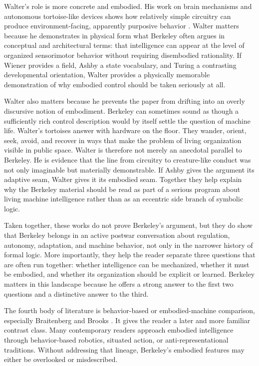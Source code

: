 \documentclass[11pt]{article}
\begin{document}
Walter's role is more concrete and embodied. His work on brain mechanisms and autonomous tortoise-like devices shows how relatively simple circuitry can produce environment-facing, apparently purposive behavior \citep{walter1953living}. Walter matters because he demonstrates in physical form what Berkeley often argues in conceptual and architectural terms: that intelligence can appear at the level of organized sensorimotor behavior without requiring disembodied rationality. If Wiener provides a field, Ashby a state vocabulary, and Turing a contrasting developmental orientation, Walter provides a physically memorable demonstration of why embodied control should be taken seriously at all.

Walter also matters because he prevents the paper from drifting into an overly discursive notion of embodiment. Berkeley can sometimes sound as though a sufficiently rich control description would by itself settle the question of machine life. Walter's tortoises answer with hardware on the floor. They wander, orient, seek, avoid, and recover in ways that make the problem of living organization visible in public space. Walter is therefore not merely an anecdotal parallel to Berkeley. He is evidence that the line from circuitry to creature-like conduct was not only imaginable but materially demonstrable. If Ashby gives the argument its adaptive seam, Walter gives it its embodied seam. Together they help explain why the Berkeley material should be read as part of a serious program about living machine intelligence rather than as an eccentric side branch of symbolic logic.

Taken together, these works do not prove Berkeley's argument, but they do show that Berkeley belongs in an active postwar conversation about regulation, autonomy, adaptation, and machine behavior, not only in the narrower history of formal logic. More importantly, they help the reader separate three questions that are often run together: whether intelligence can be mechanized, whether it must be embodied, and whether its organization should be explicit or learned. Berkeley matters in this landscape because he offers a strong answer to the first two questions and a distinctive answer to the third.

The fourth body of literature is behavior-based or embodied-machine comparison, especially Braitenberg and Brooks \citep{braitenberg1984vehicles,brooks1986robust,brooks1991intelligence}. It gives the reader a later and more familiar contrast class. Many contemporary readers approach embodied intelligence through behavior-based robotics, situated action, or anti-representational traditions. Without addressing that lineage, Berkeley's embodied features may either be overlooked or misdescribed.
\end{document}
